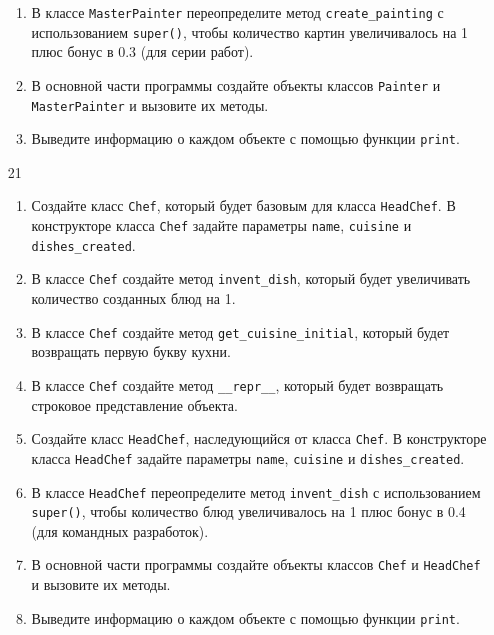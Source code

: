 \begin{enumerate}
\begin{enumerate}[leftmargin=*]
    \item В классе \texttt{MasterPainter} переопределите метод \texttt{create\_painting} с использованием \texttt{super()}, чтобы количество картин увеличивалось на 1 плюс бонус в 0.3 (для серии работ).
    
    \item В основной части программы создайте объекты классов \texttt{Painter} и \texttt{MasterPainter} и вызовите их методы.
    
    \item Выведите информацию о каждом объекте с помощью функции \texttt{print}.
\end{enumerate}

\item[21] 
\begin{enumerate}[leftmargin=*]
    \item Создайте класс \texttt{Chef}, который будет базовым для класса \texttt{HeadChef}. В конструкторе класса \texttt{Chef} задайте параметры \texttt{name}, \texttt{cuisine} и \texttt{dishes\_created}.
    
    \item В классе \texttt{Chef} создайте метод \texttt{invent\_dish}, который будет увеличивать количество созданных блюд на 1.
    
    \item В классе \texttt{Chef} создайте метод \texttt{get\_cuisine\_initial}, который будет возвращать первую букву кухни.
    
    \item В классе \texttt{Chef} создайте метод \texttt{\_\_repr\_\_}, который будет возвращать строковое представление объекта.
    
    \item Создайте класс \texttt{HeadChef}, наследующийся от класса \texttt{Chef}. В конструкторе класса \texttt{HeadChef} задайте параметры \texttt{name}, \texttt{cuisine} и \texttt{dishes\_created}.
    
    \item В классе \texttt{HeadChef} переопределите метод \texttt{invent\_dish} с использованием \texttt{super()}, чтобы количество блюд увеличивалось на 1 плюс бонус в 0.4 (для командных разработок).
    
    \item В основной части программы создайте объекты классов \texttt{Chef} и \texttt{HeadChef} и вызовите их методы.
    
    \item Выведите информацию о каждом объекте с помощью функции \texttt{print}.
\end{enumerate}


\end{enumerate}
